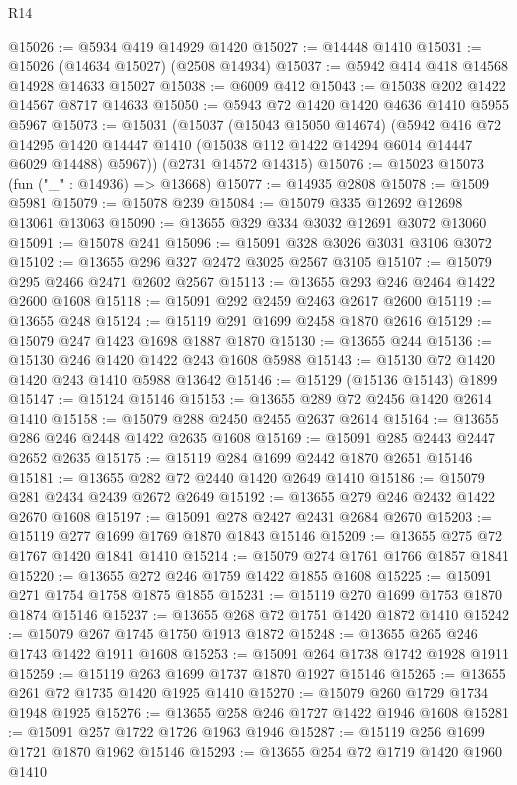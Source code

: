 \begin{lexlean}{R14}
\begin{coremodule}
@15026 := @5934 @419 @14929 @1420
@15027 := @14448 @1410
@15031 := @15026 (@14634 @15027) (@2508 @14934)
@15037 := @5942 @414 @418 @14568 @14928 @14633 @15027
@15038 := @6009 @412
@15043 := @15038 @202 @1422 @14567 @8717 @14633
@15050 := @5943 @72 @1420 @1420 @4636 @1410 @5955 @5967
@15073 := @15031
    (@15037
      (@15043 @15050 @14674)
      (@5942
        @416
        @72
        @14295
        @1420
        @14447
        @1410
        (@15038 @112 @1422 @14294 @6014 @14447 @6029 @14488)
        @5967))
    (@2731 @14572 @14315)
@15076 := @15023 @15073 (fun ("_" : @14936) => @13668)
@15077 := @14935 @2808
@15078 := @1509 @5981
@15079 := @15078 @239
@15084 := @15079 @335 @12692 @12698 @13061 @13063
@15090 := @13655 @329 @334 @3032 @12691 @3072 @13060
@15091 := @15078 @241
@15096 := @15091 @328 @3026 @3031 @3106 @3072
@15102 := @13655 @296 @327 @2472 @3025 @2567 @3105
@15107 := @15079 @295 @2466 @2471 @2602 @2567
@15113 := @13655 @293 @246 @2464 @1422 @2600 @1608
@15118 := @15091 @292 @2459 @2463 @2617 @2600
@15119 := @13655 @248
@15124 := @15119 @291 @1699 @2458 @1870 @2616
@15129 := @15079 @247 @1423 @1698 @1887 @1870
@15130 := @13655 @244
@15136 := @15130 @246 @1420 @1422 @243 @1608 @5988
@15143 := @15130 @72 @1420 @1420 @243 @1410 @5988 @13642
@15146 := @15129 (@15136 @15143) @1899
@15147 := @15124 @15146
@15153 := @13655 @289 @72 @2456 @1420 @2614 @1410
@15158 := @15079 @288 @2450 @2455 @2637 @2614
@15164 := @13655 @286 @246 @2448 @1422 @2635 @1608
@15169 := @15091 @285 @2443 @2447 @2652 @2635
@15175 := @15119 @284 @1699 @2442 @1870 @2651 @15146
@15181 := @13655 @282 @72 @2440 @1420 @2649 @1410
@15186 := @15079 @281 @2434 @2439 @2672 @2649
@15192 := @13655 @279 @246 @2432 @1422 @2670 @1608
@15197 := @15091 @278 @2427 @2431 @2684 @2670
@15203 := @15119 @277 @1699 @1769 @1870 @1843 @15146
@15209 := @13655 @275 @72 @1767 @1420 @1841 @1410
@15214 := @15079 @274 @1761 @1766 @1857 @1841
@15220 := @13655 @272 @246 @1759 @1422 @1855 @1608
@15225 := @15091 @271 @1754 @1758 @1875 @1855
@15231 := @15119 @270 @1699 @1753 @1870 @1874 @15146
@15237 := @13655 @268 @72 @1751 @1420 @1872 @1410
@15242 := @15079 @267 @1745 @1750 @1913 @1872
@15248 := @13655 @265 @246 @1743 @1422 @1911 @1608
@15253 := @15091 @264 @1738 @1742 @1928 @1911
@15259 := @15119 @263 @1699 @1737 @1870 @1927 @15146
@15265 := @13655 @261 @72 @1735 @1420 @1925 @1410
@15270 := @15079 @260 @1729 @1734 @1948 @1925
@15276 := @13655 @258 @246 @1727 @1422 @1946 @1608
@15281 := @15091 @257 @1722 @1726 @1963 @1946
@15287 := @15119 @256 @1699 @1721 @1870 @1962 @15146
@15293 := @13655 @254 @72 @1719 @1420 @1960 @1410

\end{coremodule}
\end{lexlean}
